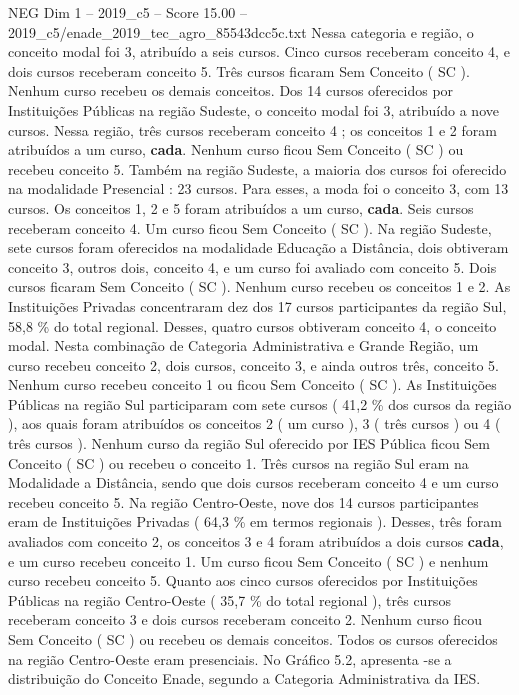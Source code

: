 \begin{textsample}{NEG Dim 1 – 2019\_c5 – Score 15.00 – 2019\_c5/enade\_2019\_tec\_agro\_85543dcc5c.txt}
Nessa categoria e região, o conceito modal foi 3, atribuído a seis cursos.
Cinco cursos receberam conceito 4, e dois cursos receberam conceito 5.
Três cursos ficaram Sem Conceito ( SC ).
Nenhum curso recebeu os demais conceitos.
Dos 14 cursos oferecidos por Instituições Públicas na região Sudeste, o conceito modal foi 3, atribuído a nove cursos.
Nessa região, três cursos receberam conceito 4 ; os conceitos 1 e 2 foram atribuídos a um curso, \textbf{cada}.
Nenhum curso ficou Sem Conceito ( SC ) ou recebeu conceito 5.
Também na região Sudeste, a maioria dos cursos foi oferecido na modalidade Presencial : 23 cursos.
Para esses, a moda foi o conceito 3, com 13 cursos.
Os conceitos 1, 2 e 5 foram atribuídos a um curso, \textbf{cada}.
Seis cursos receberam conceito 4.
Um curso ficou Sem Conceito ( SC ).
Na região Sudeste, sete cursos foram oferecidos na modalidade Educação a Distância, dois obtiveram conceito 3, outros dois, conceito 4, e um curso foi avaliado com conceito 5.
Dois cursos ficaram Sem Conceito ( SC ).
Nenhum curso recebeu os conceitos 1 e 2.
As Instituições Privadas concentraram dez dos 17 cursos participantes da região Sul, 58,8 \% do total regional.
Desses, quatro cursos obtiveram conceito 4, o conceito modal.
Nesta combinação de Categoria Administrativa e Grande Região, um curso recebeu conceito 2, dois cursos, conceito 3, e ainda outros três, conceito 5.
Nenhum curso recebeu conceito 1 ou ficou Sem Conceito ( SC ).
As Instituições Públicas na região Sul participaram com sete cursos ( 41,2 \% dos cursos da região ), aos quais foram atribuídos os conceitos 2 ( um curso ), 3 ( três cursos ) ou 4 ( três cursos ).
Nenhum curso da região Sul oferecido por IES Pública ficou Sem Conceito ( SC ) ou recebeu o conceito 1.
Três cursos na região Sul eram na Modalidade a Distância, sendo que dois cursos receberam conceito 4 e um curso recebeu conceito 5.
Na região Centro-Oeste, nove dos 14 cursos participantes eram de Instituições Privadas ( 64,3 \% em termos regionais ).
Desses, três foram avaliados com conceito 2, os conceitos 3 e 4 foram atribuídos a dois cursos \textbf{cada}, e um curso recebeu conceito 1.
Um curso ficou Sem Conceito ( SC ) e nenhum curso recebeu conceito 5.
Quanto aos cinco cursos oferecidos por Instituições Públicas na região Centro-Oeste ( 35,7 \% do total regional ), três cursos receberam conceito 3 e dois cursos receberam conceito 2.
Nenhum curso ficou Sem Conceito ( SC ) ou recebeu os demais conceitos.
Todos os cursos oferecidos na região Centro-Oeste eram presenciais.
No Gráfico 5.2, apresenta -se a distribuição do Conceito Enade, segundo a Categoria Administrativa da IES.

\end{textsample}
